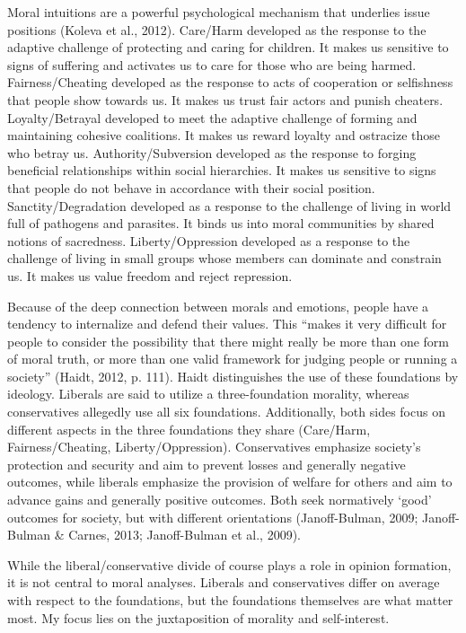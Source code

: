 \documentclass[12pt,econ]{sources/authesis}
\begin{document}
Moral intuitions are a powerful psychological mechanism that underlies issue positions (Koleva et al., 2012). Care/Harm developed as the response to the adaptive challenge of protecting and caring for children. It makes us sensitive to signs of suffering and activates us to care for those who are being harmed. Fairness/Cheating developed as the response to acts of cooperation or selfishness that people show towards us. It makes us trust fair actors and punish cheaters. Loyalty/Betrayal developed to meet the adaptive challenge of forming and maintaining cohesive coalitions. It makes us reward loyalty and ostracize those who betray us. Authority/Subversion developed as the response to forging beneficial relationships within social hierarchies. It makes us sensitive to signs that people do not behave in accordance with their social position. Sanctity/Degradation developed as a response to the challenge of living in world full of pathogens and parasites. It binds us into moral communities by shared notions of sacredness. Liberty/Oppression developed as a response to the challenge of living in small groups whose members can dominate and constrain us. It makes us value freedom and reject repression.

Because of the deep connection between morals and emotions, people have a tendency to internalize and defend their values. This ``makes it very difficult for people to consider the possibility that there might really be more than one form of moral truth, or more than one valid framework for judging people or running a society'' (Haidt, 2012, p. 111). Haidt distinguishes the use of these foundations by ideology. Liberals are said to utilize a three-foundation morality, whereas conservatives allegedly use all six foundations. Additionally, both sides focus on different aspects in the three foundations they share (Care/Harm, Fairness/Cheating, Liberty/Oppression). Conservatives emphasize society's protection and security and aim to prevent losses and generally negative outcomes, while liberals emphasize the provision of welfare for others and aim to advance gains and generally positive outcomes. Both seek normatively `good' outcomes for society, but with different orientations (Janoff-Bulman, 2009; Janoff-Bulman \& Carnes, 2013; Janoff-Bulman et al., 2009).

While the liberal/conservative divide of course plays a role in opinion formation, it is not central to moral analyses. Liberals and conservatives differ on average with respect to the foundations, but the foundations themselves are what matter most. My focus lies on the juxtaposition of morality and self-interest.
\end{document}
